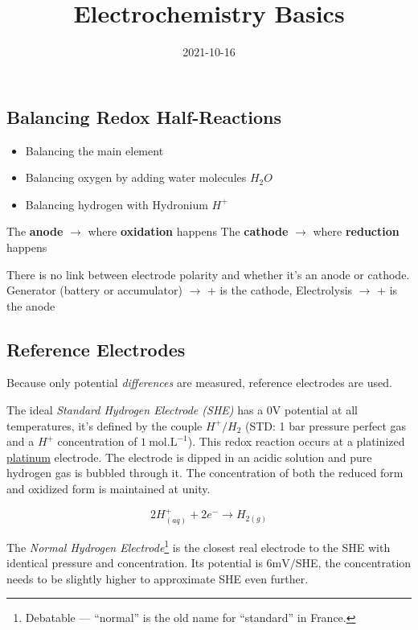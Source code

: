 \documentclass[
  letterpaper,
  DIV=11,
  numbers=noendperiod]{scrartcl}
\title{Electrochemistry Basics}
\author{}
\date{2021-10-16}
\providecommand{\tightlist}{%
  \setlength{\itemsep}{0pt}\setlength{\parskip}{0pt}}
\begin{document}
\maketitle


\subsection{Balancing Redox
Half-Reactions}\label{balancing-redox-half-reactions}

\begin{itemize}
\tightlist
\item
  Balancing the main element
\item
  Balancing oxygen by adding water molecules \(H_2O\)
\item
  Balancing hydrogen with Hydronium \(H^+\)
\end{itemize}

The \textbf{anode} \(\rightarrow\) where \textbf{oxidation} happens The
\textbf{cathode} \(\rightarrow\) where \textbf{reduction} happens

There is no link between electrode polarity and whether it's an anode or
cathode. Generator (battery or accumulator) \(\rightarrow\) + is the
cathode, Electrolysis \(\rightarrow\) + is the anode

\subsection{Reference Electrodes}\label{reference-electrodes}

Because only potential \emph{differences} are measured, reference
electrodes are used.

The ideal \emph{Standard Hydrogen Electrode (SHE)} has a 0V potential at
all temperatures, it's defined by the couple \(H^+ / H_2\) (STD: 1 bar
pressure perfect gas and a \(H^+\) concentration of
\(1\ \text{mol.L}^{-1}\)). This redox reaction occurs at a platinized
\href{https://en.wikipedia.org/wiki/Platinum}{platinum} electrode. The
electrode is dipped in an acidic solution and pure hydrogen gas is
bubbled through it. The concentration of both the reduced form and
oxidized form is maintained at unity.

\[
2 H^+_{(aq)} + 2 e^− → H_{2(g)}
\]

The \emph{Normal Hydrogen Electrode}\footnote{Debatable --- ``normal''
  is the old name for ``standard'' in France.} is the closest real
electrode to the SHE with identical pressure and concentration. Its
potential is \(6\text{mV}/\)SHE, the concentration needs to be slightly
higher to approximate SHE even further.
\end{document}
